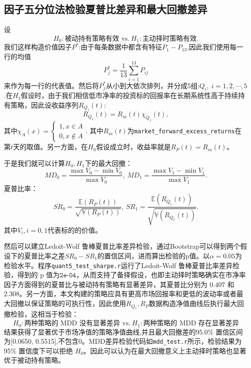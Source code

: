 \documentclass[11pt, a4paper]{article}
\begin{document}
\subsection{因子五分位法检验夏普比差异和最大回撤差异}
设
$$H_0:\text{被动持有策略有效 vs.}\ H_1:\text{主动择时策略有效}.$$
我们这样构造价值因子$P^*$:由于每条数据中都含有特征$P_1-P_{13}$,因此我们使用每一行的均值
$$P^*_j=\frac{1}{13}\sum_{i=1}^{13}P_{ij}$$
来作为每一行的代表值。然后将$P^*_j$从小到大依次排列，并分成5组:$Q_i,\ i=1,2,\cdots,5$.在$H_1$假设时，由于我们相信低市净率的投资标的回报率在长期系统性高于持续持有策略，因此设收益序列$R_{Q_1}(t)$:
$$R_{Q_1}(t)=R_m(t)\chi_{Q_1}(t),$$
其中$\chi_A(x)=\begin{cases}
    1,x\in A\\
    0,x\notin A
\end{cases}.$
其中$R_m(t)$为\texttt{market\_forward\_excess\_returns}在第$t$天的取值。另一方面，在$H_0$假设成立时，收益率就是$R_P(t)=R_m(t)$。

于是我们就可以计算$H_0,H_1$下的最大回撤：
$$MD_0 =\frac{\max{V_0}-\min{V_0}}{\max{V_0}},\ MD_1 =\frac{\max{V_1}-\min{V_1}}{\max{V_1}}.$$
夏普比率：
$$SR_0 = \frac{\mathbb{E}(R_P(t))}{\sqrt{\mathbb{V}(R_P(t))}},\ SR_1=\frac{\mathbb{E}(R_{Q_1}(t))}{\sqrt{\mathbb{V}(R_{Q_1}(t))}}.$$
其中$V_i,i=0,1$代表标的的价值。

然后可以建立Ledoit-Wolf 鲁棒夏普比率差异检验\cite{ledoit2008robust}，通过Bootstrap可以得到两个假设下的夏普比率之差$SR_0-SR_1$的置信区间，进而算出检验的p值。以$\alpha=0.05$为检验水平。程序\texttt{quant5\_test\_sharpe.r}运行了Ledoit-Wolf 鲁棒夏普比率差异检验，得到的 p 值为$ \texttt{2e-04}$，从而支持了备择假设，也即主动择时策略确实在市净率因子方面得到的夏普比与被动持有策略有显著差异，其夏普比分别为 \(0.407\) 和 \(2.308\)。另一方面，本文构建的策略应具有更高市场回报率和更低的波动率或者最大回撤以保证策略的可执行性，因此使用$R_{Q_1},R_P$数据构造净值曲线后执行最大回撤检验，这相当于检验：
$$H_0:\text{两种策略的 MDD 没有显著差异 vs.}\ H_1:\text{两种策略的 MDD 存在显著差异}$$
结果获得了显著优于市场净值的策略净值曲线,并且最大回撤差的95.0\% 置信区间为[0.0650, 0.5515],不包含0。MDD差异检验代码如\texttt{mdd\_test.r}所示，检验结果为 95\% 置信度下可以拒绝 $H_0$。因此可以认为在最大回撤意义上主动择时策略也显著优于被动持有策略。
\end{document}
